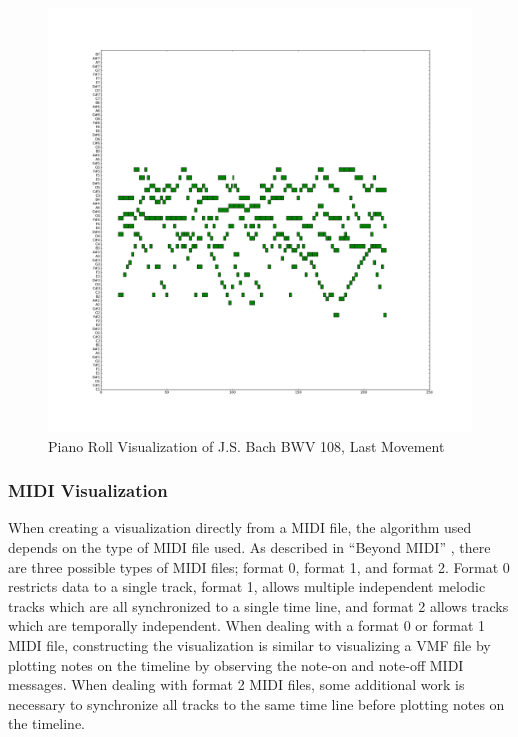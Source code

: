 \begin{figure}
  \begin{center}
    \includegraphics[scale=0.35]{resources/bwv108PianoRoll_color.png}
    \caption{Piano Roll Visualization of J.S. Bach BWV 108, Last Movement}
    \label{fig:bwv108PianoRoll}
  \end{center}
\end{figure}

\subsubsection{MIDI Visualization}

When creating a visualization directly from a MIDI file, the algorithm used depends on the type of MIDI file used. As described in ``Beyond MIDI'' \citep*{HeSe97}, there are three possible types of MIDI files; format 0, format 1, and format 2. Format 0 restricts data to a single track, format 1, allows multiple independent melodic tracks which are all synchronized to a single time line, and format 2 allows tracks which are temporally independent. When dealing with a format 0 or format 1 MIDI file, constructing the visualization is similar to visualizing a VMF file by plotting notes on the timeline by observing the note-on and note-off MIDI messages. When dealing with format 2 MIDI files, some additional work is necessary to synchronize all tracks to the same time line before plotting notes on the timeline.

